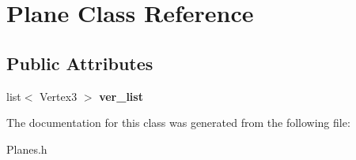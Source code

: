 \hypertarget{class_plane}{}\section{Plane Class Reference}
\label{class_plane}
\subsection*{Public Attributes}
\begin{DoxyCompactItemize}
\item 
\mbox{\label{class_plane_ab77670acf68cc5f12cc09034151c2cb7}} 
list$<$ Vertex3 $>$ {\bfseries ver\+\_\+list}
\end{DoxyCompactItemize}


The documentation for this class was generated from the following file\+:\begin{DoxyCompactItemize}
\item 
Planes.\+h\end{DoxyCompactItemize}
